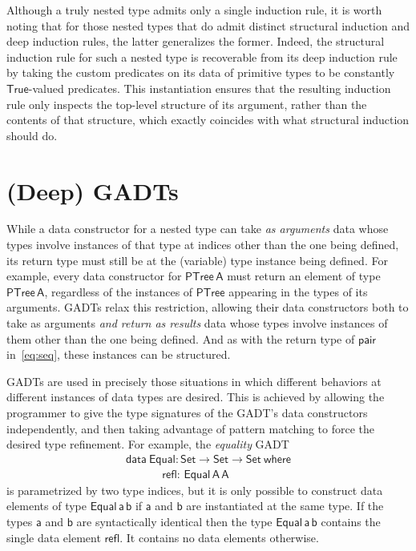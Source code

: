 \documentclass[9pt]{entcs}
\begin{document}
Although a truly nested type admits only a single induction rule, it
is worth noting that for those nested types that do admit distinct
structural induction and deep induction rules, the latter generalizes
the former. Indeed, the structural induction rule for such a nested
type is recoverable from its deep induction rule by taking the custom
predicates on its data of primitive types to be constantly
$\mathsf{True}$-valued predicates. This instantiation ensures that the
resulting induction rule only inspects the top-level structure of its
argument, rather than the contents of that structure, which exactly
coincides with what structural induction should do.

\section{(Deep) GADTs}\label{sec:GADTs}

While a data constructor for a nested type can take {\em as arguments}
data whose types involve instances of that type at indices other than
the one being defined, its return type must still be at the (variable)
type instance being defined. For example, every data constructor for
$\mathsf{PTree\,A}$ must return an element of type
$\mathsf{PTree\,A}$, regardless of the instances of $\mathsf{PTree}$
appearing in the types of its arguments. GADTs relax this restriction,
allowing their data constructors both to take as arguments \emph{and
  return as results} data whose types involve instances of them other
than the one being defined. And as with the return type of
$\mathsf{pair}$ in~\eqref{eq:seq}, these instances can be structured.

GADTs are used in precisely those situations in which different
behaviors at different instances of data types are desired. This is
achieved by allowing the programmer to give the type signatures of the
GADT's data constructors independently, and then taking advantage of
pattern matching to force the desired type refinement. For example,
the {\em equality} GADT
\begin{equation}\label{eq:equal}
\begin{array}{l}
\mathsf{data\ Equal : Set \to Set \to Set\ where}\\
\mathsf{\;\;\;\;\;\;\;\;\;\;\;\,refl :\, Equal\,A\,A}
\end{array}
\end{equation}
is parametrized by two type indices, but it is only possible to
construct data elements of type $\mathsf{Equal\,a\,b}$ if $\mathsf{a}$
and $\mathsf{b}$ are instantiated at the same type. If the types
$\mathsf{a}$ and $\mathsf{b}$ are syntactically identical then the
type $\mathsf{Equal\,a\,b}$ contains the single data element
$\mathsf{refl}$. It contains no data elements otherwise.
\end{document}
